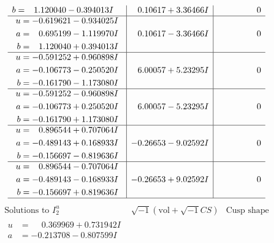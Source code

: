 \documentclass[1p]{elsarticle_modified}
\theoremstyle{definition}
\newcommand{\I}{\sqrt{-1}}
\begin{document}
$$\begin{array}{c|c|c}
\begin{aligned}
b &= \phantom{-}1.120040 - 0.394013 I\end{aligned}
 & \phantom{-}0.10617 + 3.36466 I & \phantom{-0.000000 } 0 \\ \hline\begin{aligned}
u &= -0.619621 - 0.934025 I \\
a &= \phantom{-}0.695199 - 1.119970 I \\
b &= \phantom{-}1.120040 + 0.394013 I\end{aligned}
 & \phantom{-}0.10617 - 3.36466 I & \phantom{-0.000000 } 0 \\ \hline\begin{aligned}
u &= -0.591252 + 0.960898 I \\
a &= -0.106773 - 0.250520 I \\
b &= -0.161790 - 1.173080 I\end{aligned}
 & \phantom{-}6.00057 + 5.23295 I & \phantom{-0.000000 } 0 \\ \hline\begin{aligned}
u &= -0.591252 - 0.960898 I \\
a &= -0.106773 + 0.250520 I \\
b &= -0.161790 + 1.173080 I\end{aligned}
 & \phantom{-}6.00057 - 5.23295 I & \phantom{-0.000000 } 0 \\ \hline\begin{aligned}
u &= \phantom{-}0.896544 + 0.707064 I \\
a &= -0.489143 + 0.168933 I \\
b &= -0.156697 - 0.819636 I\end{aligned}
 & -0.26653 - 9.02592 I & \phantom{-0.000000 } 0 \\ \hline\begin{aligned}
u &= \phantom{-}0.896544 - 0.707064 I \\
a &= -0.489143 - 0.168933 I \\
b &= -0.156697 + 0.819636 I\end{aligned}
 & -0.26653 + 9.02592 I & \phantom{-0.000000 } 0\\
 \hline 
 \end{array}$$\newpage$$\begin{array}{c|c|c}  
\text{Solutions to }I^u_{2}& \I (\text{vol} + \sqrt{-1}CS) & \text{Cusp shape}\\
 \hline 
\begin{aligned}
u &= \phantom{-}0.369969 + 0.731942 I \\
a &= -0.213708 - 0.807599 I \\

\end{aligned}
\end{array}$$
\end{document}
